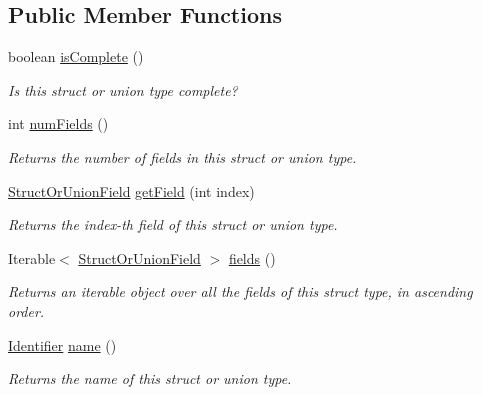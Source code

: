 \subsection*{Public Member Functions}
\begin{DoxyCompactItemize}
\item 
boolean \hyperlink{interfaceedu_1_1udel_1_1cis_1_1vsl_1_1civl_1_1model_1_1IF_1_1type_1_1CIVLStructOrUnionType_a7f891e55942dd42ba62def8d49584d34}{is\+Complete} ()
\begin{DoxyCompactList}\small\item\em Is this struct or union type complete? \end{DoxyCompactList}\item 
int \hyperlink{interfaceedu_1_1udel_1_1cis_1_1vsl_1_1civl_1_1model_1_1IF_1_1type_1_1CIVLStructOrUnionType_abfdb5d5bd9cae0e46e7fa812a4423b2d}{num\+Fields} ()
\begin{DoxyCompactList}\small\item\em Returns the number of fields in this struct or union type. \end{DoxyCompactList}\item 
\hyperlink{interfaceedu_1_1udel_1_1cis_1_1vsl_1_1civl_1_1model_1_1IF_1_1type_1_1StructOrUnionField}{Struct\+Or\+Union\+Field} \hyperlink{interfaceedu_1_1udel_1_1cis_1_1vsl_1_1civl_1_1model_1_1IF_1_1type_1_1CIVLStructOrUnionType_ad7047d0216f93a7f88154782b01a1aa7}{get\+Field} (int index)
\begin{DoxyCompactList}\small\item\em Returns the index-\/th field of this struct or union type. \end{DoxyCompactList}\item 
Iterable$<$ \hyperlink{interfaceedu_1_1udel_1_1cis_1_1vsl_1_1civl_1_1model_1_1IF_1_1type_1_1StructOrUnionField}{Struct\+Or\+Union\+Field} $>$ \hyperlink{interfaceedu_1_1udel_1_1cis_1_1vsl_1_1civl_1_1model_1_1IF_1_1type_1_1CIVLStructOrUnionType_ab62a9776d13c476bd9b64cbafd7c2c77}{fields} ()
\begin{DoxyCompactList}\small\item\em Returns an iterable object over all the fields of this struct type, in ascending order. \end{DoxyCompactList}\item 
\hyperlink{interfaceedu_1_1udel_1_1cis_1_1vsl_1_1civl_1_1model_1_1IF_1_1Identifier}{Identifier} \hyperlink{interfaceedu_1_1udel_1_1cis_1_1vsl_1_1civl_1_1model_1_1IF_1_1type_1_1CIVLStructOrUnionType_aa5f4f8294027abd003a9a9a46bfa2b17}{name} ()
\begin{DoxyCompactList}\small\item\em Returns the name of this struct or union type. \end{DoxyCompactList}\item 

\end{DoxyCompactItemize}
